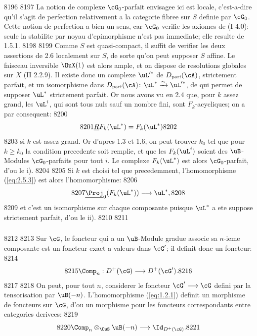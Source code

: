   8196	
  8197	La notion de complexe $\cG_0$-parfait envisagee ici est locale, c'est-a-dire qu'il s'agit de perfection relativement a la categorie fibree sur $S$ definie par $\cG_0$. Cette notion de perfection a bien un sens, car $\cG_0$ verifie les axiomes de (I 4.0): seule la stabilite par noyau d'epimorphisme n'est pas immediate; elle resulte de 1.5.1.
  8198	
  8199	Comme $S$ est quasi-compact, il suffit de verifier les deux assertions de 2.6 localement sur $S$, de sorte qu'on peut supposer $S$ affine. Le faisceau inversible $\OuX(1)$ est alors ample, et on dispose de resolutions globales sur $X$ (II 2.2.9). Il existe donc un complexe $\uL'^*$ de $D_{\text{parf}}(\cA)$, strictement parfait, et un isomorphisme dans $D_{\text{parf}}(\cA)$: $\uL^* \xrightarrow{\sim} \uL'^*$, de qui permet de supposer $\uL^*$ strictement parfait. Or nous avons vu en 2.4 que, pour $k$ assez grand, les $\uL^i$, qui sont tous nuls sauf un nombre fini, sont $F_k$-acycliques; on a par consequent:
  8200	\[
  8201	\underline{R}F_k(\uL^*) = F_k(\uL^*)
  8202	\]
  8203	si $k$ est assez grand. Or d'apres 1.3 et 1.6, on peut trouver $k_0$ tel que pour $k \geqslant k_0$ la condition precedente soit remplie, et que les $F_k(\uL^i)$ soient des $\uB$-Modules $\cG_0$-parfaits pour tout $i$. Le complexe $F_k(\uL^*)$ est alors $\cG_0$-parfait, d'ou le i).
  8204	
  8205	Si $k$ est choisi tel que precedemment, l'homomorphisme (\ref{eq:2.5.3}) est alors l'homomorphisme:
  8206	\[
  8207	\underline{\Proj}_0(F_k(\uL^*)) \longrightarrow \uL^*,
  8208	\]
  8209	et c'est un isomorphisme sur chaque composante puisque $\uL^*$ a ete suppose strictement parfait, d'ou le ii).
  8210	
  8211	\subsubsection{}
  8212	
  8213	Sur $\cG$, le foncteur qui a un $\uB$-Module gradue associe sa $n$-ieme composante est un foncteur exact a valeurs dans $\cG'$; il definit donc un foncteur:
  8214	\begin{equation}\label{eq:2.7.1}
  8215	\Comp_n : D^+(\cG) \longrightarrow D^+(\cG').
  8216	\end{equation}
  8217	
  8218	On peut, pour tout $n$, considerer le foncteur $\cG' \longrightarrow \cG$ defini par la tensorisation par $\uB(-n)$. L'homomorphisme (\ref{eq:1.2.1}) definit un morphisme de foncteurs sur $\cG$, d'ou un morphisme pour les foncteurs correspondants entre categories derivees:
  8219	\begin{equation}\label{eq:2.7.2}
  8220	\Comp_n \otimes_{\OuS} \uB(-n) \longrightarrow \Id_{D^+(\cG)}.
  8221	\end{equation}
